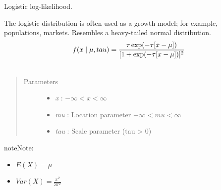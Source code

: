 \documentclass[letterpaper,10pt,english]{sphinxmanual}
\begin{document}
\begin{fulllineitems}
\label{distributions:pymc.distributions.logistic_like}
Logistic log-likelihood.

The logistic distribution is often used as a growth model; for example,
populations, markets. Resembles a heavy-tailed normal distribution.
\begin{gather}
\begin{split}f(x \mid \mu, tau) = \frac{\tau \exp(-\tau[x-\mu])}{[1 + \exp(-\tau[x-\mu])]^2}\end{split}\notag\\\begin{split}\end{split}\notag
\end{gather}\begin{quote}\begin{description}
\item[{Parameters }] \leavevmode\begin{itemize}
\item {} 
\emph{x} : $-\infty < x < \infty$

\item {} 
\emph{mu} : Location parameter $-\infty < mu < \infty$

\item {} 
\emph{tau} : Scale parameter (tau \textgreater{} 0)

\end{itemize}

\end{description}\end{quote}

\begin{notice}{note}{Note:}\begin{itemize}
\item {} 
$E(X) = \mu$

\item {} 
$Var(X) = \frac{\pi^2}{3\tau^2}$

\end{itemize}
\end{notice}

\end{fulllineitems}

\end{document}

